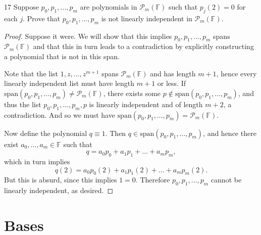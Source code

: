 \documentclass{extarticle}
\newenvironment{problem}[1]{\begin{prob*}{#1}{}}{\end{prob*}}
\newcommand{\F}{\mathbb{F}}
\newcommand{\Span}{\mathrm{span}}
\begin{document}
\begin{problem}{17}
Suppose $p_0, p_1,\dots, p_m$ are polynomials in $\mathcal{P}_m(\F)$ such that $p_j(2)=0$ for each $j$.  Prove that $p_0,p_1,\dots,p_m$ is not linearly independent in $\mathcal{P}_m(\F)$.
\end{problem}
\begin{proof}
Suppose it were.  We will show that this implies $p_0, p_1,\dots, p_m$ spans $\mathcal{P}_m(\F)$ and that this in turn leads to a contradiction by explicitly constructing a polynomial that is not in this span.
\par Note that the list $1,z,\dots, z^{m+1}$ spans $\mathcal{P}_m(\F)$ and has length $m+1$, hence every linearly independent list must have length $m+1$ or less.  If $\Span(p_0, p_1,\dots, p_m)\neq \mathcal{P}_m(\F)$, there exists some $p\not\in\Span(p_0,p_1,\dots, p_m)$, and thus the list $p_0,p_1, \dots,p_m, p$ is linearly independent and of length $m+2$, a contradiction.  And so we must have $\Span(p_0,p_1,\dots,p_m) = \mathcal{P}_m(\F)$.
\par Now define the polynomial $q\equiv 1$.  Then $q\in\Span(p_0, p_1,\dots, p_m)$, and hence there exist $a_0,\dots, a_m\in\F$ such that 
\begin{equation*}
q = a_0p_0+a_1p_1 + \dots + a_mp_m,
\end{equation*}
which in turn implies 
\begin{equation*}
q(2) = a_0p_0(2)+a_1p_1(2) + \dots + a_mp_m(2).
\end{equation*}
But this is absurd, since this implies $1 = 0$.  Therefore $p_0,p_1,\dots,p_m$ cannot be linearly independent, as desired.
\end{proof}


\section{Bases}
\end{document}
